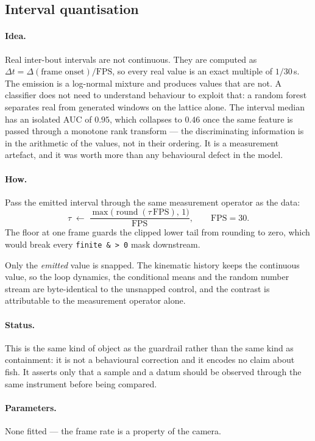 \subsection{Interval quantisation}

\paragraph{Idea.} Real inter-bout intervals are not continuous. They are computed as
$\Delta t = \Delta(\text{frame onset})/\mathrm{FPS}$, so every real value is an exact multiple of
$1/30$\,s. The emission is a log-normal mixture and produces values that are not. A classifier does
not need to understand behaviour to exploit that: a random forest separates real from generated
windows on the lattice alone. The interval median has an isolated AUC of $0.95$, which collapses to
$0.46$ once the same feature is passed through a monotone rank transform --- the discriminating
information is in the arithmetic of the values, not in their ordering. It is a measurement
artefact, and it was worth more than any behavioural defect in the model.

\paragraph{How.} Pass the emitted interval through the same measurement operator as the data:
\[
\tau \;\leftarrow\; \frac{\max\bigl(\operatorname{round}(\tau\,\mathrm{FPS}),\,1\bigr)}{\mathrm{FPS}},
\qquad \mathrm{FPS}=30 .
\]
The floor at one frame guards the clipped lower tail from rounding to zero, which would break every
\texttt{finite \& > 0} mask downstream.

Only the \emph{emitted} value is snapped. The kinematic history keeps the continuous value, so the
loop dynamics, the conditional means and the random number stream are byte-identical to the
unsnapped control, and the contrast is attributable to the measurement operator alone.

\paragraph{Status.} This is the same kind of object as the guardrail rather than the same kind as
containment: it is not a behavioural correction and it encodes no claim about fish. It asserts only
that a sample and a datum should be observed through the same instrument before being compared.

\paragraph{Parameters.} None fitted --- the frame rate is a property of the camera.


